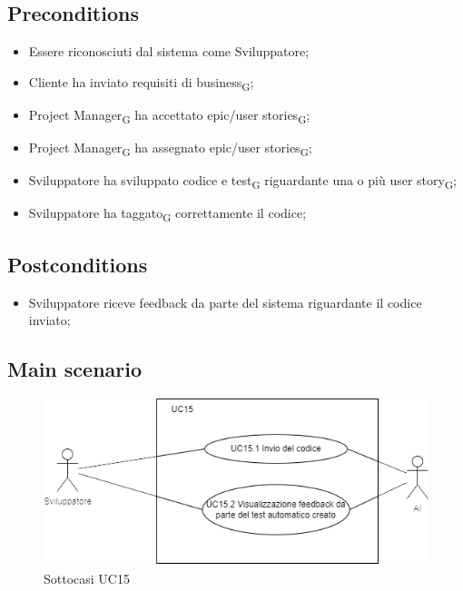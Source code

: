 \documentclass{article}
\begin{document}
    \subsection*{Preconditions}
        \begin{itemize}
            \item Essere riconosciuti dal sistema come Sviluppatore;
            \item Cliente ha inviato requisiti di business\textsubscript{G};
            \item Project Manager\textsubscript{G} ha accettato epic/user stories\textsubscript{G};
            \item Project Manager\textsubscript{G} ha assegnato epic/user stories\textsubscript{G};
            \item Sviluppatore ha sviluppato codice e test\textsubscript{G} riguardante una o più user story\textsubscript{G};
            \item Sviluppatore ha taggato\textsubscript{G} correttamente il codice;
        \end{itemize}
        
    \subsection*{Postconditions}
        \begin{itemize}
            \item Sviluppatore riceve feedback da parte del sistema riguardante il codice inviato;
        \end{itemize}
    
    \subsection*{Main scenario}
        \begin{figure}[h]
          \centering
          \includegraphics{./imgUML/UC15-zoom.png}
          \caption{Sottocasi UC15}
          \label{fig:UC15_sottocasi}
        \end{figure}
        
\end{document}
